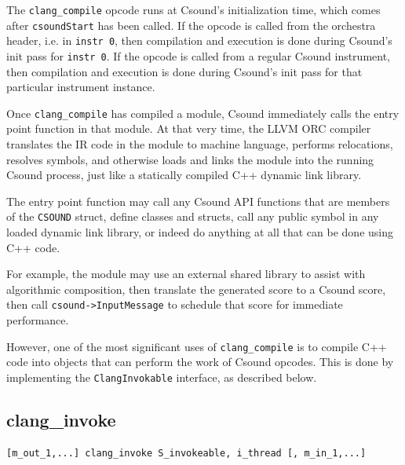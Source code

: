 \documentclass[letterpaper, 12pt]{article}
\begin{document}
The \verb|clang_compile| opcode runs at Csound's initialization time, which 
comes after \verb|csoundStart| has been called. If the opcode is called from the 
orchestra header, i.e. in \verb|instr 0|, then compilation and execution is done during Csound's init pass for \verb|instr 0|. If the opcode is called from a regular Csound 
instrument, then compilation and execution is done during Csound's init pass for that particular instrument instance.

Once \verb|clang_compile| has compiled a module, Csound immediately 
calls the entry point function in that module. At that very time, the LLVM ORC 
compiler translates the IR code in the module to machine language, performs 
relocations, resolves symbols, and otherwise loads and links the module into the 
running Csound process, just like a statically compiled C++ dynamic link library.

The entry point function may call any Csound API functions that are members of 
the \verb|CSOUND| struct, define classes and structs, call any public symbol in any 
loaded dynamic link library, or indeed do anything at all that can be done 
using C++ code.

For example, the module may use an external shared library to assist with 
algorithmic composition, then translate the generated score to a Csound score, 
then call \verb|csound->InputMessage| to schedule that score for immediate 
performance.

However, one of the most significant uses of \verb|clang_compile| is to compile C++
code into objects that can perform the work of Csound opcodes. This is 
done by implementing the \verb|ClangInvokable| interface, as described below.

\subsection{clang\_invoke}

\begin{Verbatim}[fontfamily=courier, xleftmargin=\parindent]
[m_out_1,...] clang_invoke S_invokeable, i_thread [, m_in_1,...]
\end{Verbatim}
\end{document}
